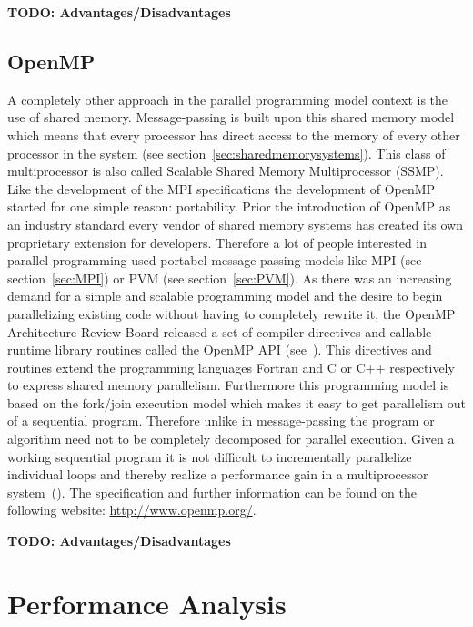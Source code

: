 \textbf{TODO: Advantages/Disadvantages}


\subsection{OpenMP}
\label{sec:OpenMP}

A completely other approach in the parallel programming model context
is the use of shared memory. Message-passing is built upon this shared
memory model which means that every processor has direct access to the
memory of every other processor in the system
(see section~\ref{sec:sharedmemorysystems}). This class of
multiprocessor is also called Scalable Shared Memory Multiprocessor
(SSMP). Like the development of the MPI specifications the development
of OpenMP started for one simple reason: portability. Prior the
introduction of OpenMP as an industry standard every vendor of shared
memory systems has created its own proprietary extension for
developers. Therefore a lot of people interested in parallel
programming used portabel message-passing models like MPI (see
section~\ref{sec:MPI}) or PVM (see section~\ref{sec:PVM}). As there
was an increasing demand for a simple and scalable programming model and
the desire to begin parallelizing existing code without having to
completely rewrite it, the OpenMP Architecture Review Board released a
set of compiler directives and callable runtime library routines
called the OpenMP API (see~\cite{openMP05}). This directives and
routines extend the
programming languages Fortran and C or C++ respectively to express
shared memory parallelism.
Furthermore this programming model is based on the fork/join execution
model which makes it easy to get parallelism out of a sequential
program. Therefore unlike in message-passing the program or algorithm
need not to be completely decomposed for parallel execution. Given a
working sequential program it is not difficult to incrementally
parallelize individual loops and thereby realize a performance gain in
a multiprocessor system~(\cite{dagum1997opi}). The specification and
further information can be found on the following website:
\url{http://www.openmp.org/}.

\textbf{TODO: Advantages/Disadvantages}


\section{Performance Analysis}
\label{sec:perf_analysis}

